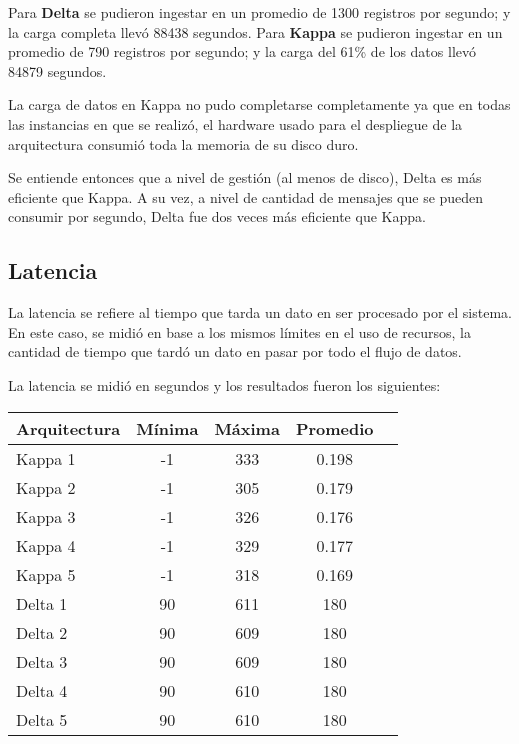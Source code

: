 Para \textbf{Delta} se pudieron ingestar en un promedio de 1300 registros por segundo; y la carga completa llevó 88438 segundos.
Para \textbf{Kappa} se pudieron ingestar en un promedio de 790 registros por segundo; y la carga del 61\% de los datos llevó 84879 segundos.\newline

La carga de datos en Kappa no pudo completarse completamente ya que en todas las instancias en que se realizó, 
el hardware usado para el despliegue de la arquitectura consumió toda la memoria de su disco duro.  \newline

Se entiende entonces que a nivel de gestión (al menos de disco), Delta es más eficiente que Kappa.
A su vez, a nivel de cantidad de mensajes que se pueden consumir por segundo, Delta fue dos veces más eficiente que Kappa.

\newpage

\subsection{Latencia}

La latencia se refiere al tiempo que tarda un dato en ser procesado por el sistema.
En este caso, se midió en base a los mismos límites en el uso de recursos, la cantidad de tiempo que tardó un dato en pasar por todo el flujo de datos.\newline

La latencia se midió en segundos y los resultados fueron los siguientes:

\begin{longtable}{|p{3cm}|c|c|c|c|}
    \hline
    \textbf{Arquitectura} & \textbf{Mínima} & \textbf{Máxima} & \textbf{Promedio} \\
    \hline
    Kappa 1 & -1 & 333 & 0.198 \\
    \hline
    Kappa 2 & -1 & 305 & 0.179 \\
    \hline
    Kappa 3 & -1 & 326 & 0.176 \\
    \hline
    Kappa 4 & -1 & 329 & 0.177 \\
    \hline
    Kappa 5 & -1 & 318 & 0.169 \\
    \hline
    Delta 1 & 90 & 611 & 180 \\
    \hline
    Delta 2 & 90 & 609 & 180 \\
    \hline
    Delta 3 & 90 & 609 & 180 \\
    \hline
    Delta 4 & 90 & 610 & 180 \\
    \hline
    Delta 5 & 90 & 610 & 180 \\
    \hline
\end{longtable}

